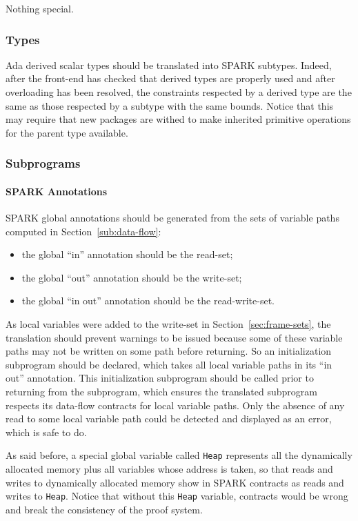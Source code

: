\documentclass{article}
\newcommand{\code}[1]{\texttt{#1}}
\newcommand{\heap}{\code{Heap}\xspace}
\begin{document}
Nothing special.

\subsubsection{Types}
\label{SPARK2SPARK:types}

Ada derived scalar types should be translated into SPARK subtypes. Indeed,
after the front-end has checked that derived types are properly used and after
overloading has been resolved, the constraints respected by a derived type are
the same as those respected by a subtype with the same bounds. Notice that this
may require that new packages are withed to make inherited primitive operations
for the parent type available.

\subsubsection{Subprograms}

\paragraph{SPARK Annotations}

SPARK global annotations should be generated from the sets of variable paths
computed in Section~\ref{sub:data-flow}:
\begin{itemize}
\item the global ``in'' annotation should be the read-set;
\item the global ``out'' annotation should be the write-set;
\item the global ``in out'' annotation should be the read-write-set.
\end{itemize}

As local variables were added to the write-set in Section~\ref{sec:frame-sets},
the translation should prevent warnings to be issued because some of these
variable paths may not be written on some path before returning. So an
initialization subprogram should be declared, which takes all local variable
paths in its ``in out'' annotation. This initialization subprogram should be
called prior to returning from the subprogram, which ensures the translated
subprogram respects its data-flow contracts for local variable paths. Only the
absence of any read to some local variable path could be detected and displayed
as an error, which is safe to do.

As said before, a special global variable called \heap represents all the
dynamically allocated memory plus all variables whose address is taken, so that
reads and writes to dynamically allocated memory show in SPARK contracts
as reads and writes to \heap. Notice that without this \heap variable,
contracts would be wrong and break the consistency of the proof system.
\end{document}

